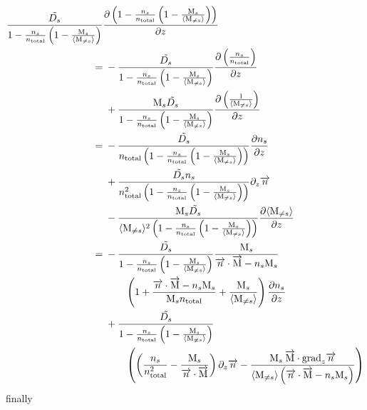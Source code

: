 \begin{equation}
\begin{split}
\frac{\tilde{D_s}}{1-\frac{n_s}{n_\text{total}}\left(1 - \frac{\text{M}_s}{\langle\text{M}_{\neq s}\rangle}\right)}
 &  \frac{\partial\left(1-\frac{n_s}{n_\text{total}}\left(1 - \frac{\text{M}_s}{\langle\text{M}_{\neq s}\rangle}\right)\right)}{\partial z} \\
        = &\; - \frac{\tilde{D_s}}{1-\frac{n_s}{n_\text{total}}\left(1 - \frac{\text{M}_s}{\langle\text{M}_{\neq s}\rangle}\right)}
                 \frac{\partial\left(\frac{n_s}{n_\text{total}}\right)}{\partial z}\\
          &\; + \frac{\text{M}_s\tilde{D_s}}{1-\frac{n_s}{n_\text{total}}\left(1 - \frac{\text{M}_s}{\langle\text{M}_{\neq s}\rangle}\right)}
                 \frac{\partial\left(\frac{1}{\langle\text{M}_{\neq s}\rangle}\right)}{\partial z}\\
        = &\; - \frac{\tilde{D_s}}{n_\text{total}\left(1-\frac{n_s}{n_\text{total}}\left(1 - \frac{\text{M}_s}{\langle\text{M}_{\neq s}\rangle}\right)\right)}
                 \frac{\partial n_s}{\partial z}\\
          &\; + \frac{\tilde{D_s}n_s}{n_\text{total}^2\left(1-\frac{n_s}{n_\text{total}}\left(1 - \frac{\text{M}_s}{\langle\text{M}_{\neq s}\rangle}\right)\right)}
                 \partial_{z}{\overrightarrow{n}}\\
          &\; - \frac{\text{M}_s\tilde{D_s}}{\langle\text{M}_{\neq s}\rangle^2\left(1-\frac{n_s}{n_\text{total}}\left(1 - \frac{\text{M}_s}{\langle\text{M}_{\neq s}\rangle}\right)\right)}
                 \frac{\partial\langle\text{M}_{\neq s}\rangle}{\partial z}\\
        = &\; - \frac{\tilde{D_s}}{1-\frac{n_s}{n_\text{total}}\left(1 - \frac{\text{M}_s}{\langle\text{M}_{\neq s}\rangle}\right)}
                  \frac{\text{M}_s}{\overrightarrow{n}\cdot\overrightarrow{\text{M}} - n_s\text{M}_s} \\
          &\;\qquad   \left(1 + \frac{\overrightarrow{n}\cdot\overrightarrow{\text{M}} - n_s\text{M}_s}{\text{M}_sn_\text{total}} + \frac{\text{M}_s}{\langle\text{M}_{\neq s}\rangle}\right) 
                        \frac{\partial n_s}{\partial z} \\
          &\; + \frac{\tilde{D_s}}{1-\frac{n_s}{n_\text{total}}\left(1 - \frac{\text{M}_s}{\langle\text{M}_{\neq s}\rangle}\right)} \\
          &\;\qquad \left(\left(\frac{n_s}{n_\text{total}^2} - \frac{\text{M}_s}{\overrightarrow{n}\cdot\overrightarrow{\text{M}}}\right)\partial_{z}{\overrightarrow{n}}
                        - \frac{\text{M}_s\:\overrightarrow{\text{M}}\cdot\text{grad}_{z}\overrightarrow{n}}
                               {\langle\text{M}_{\neq s}\rangle\left(\overrightarrow{n}\cdot\overrightarrow{\text{M}} - n_s\text{M}_s\right)}
                    \right)\\
\end{split}
\end{equation}
finally
